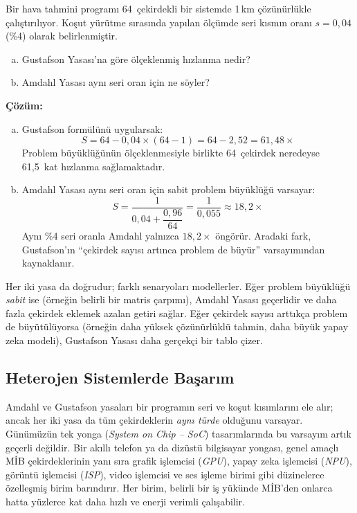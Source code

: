 \begin{ornek}[2.11]
Bir hava tahmini programı 64~çekirdekli bir sistemde 1\,km çözünürlükle çalıştırılıyor. Koşut yürütme sırasında yapılan ölçümde seri kısmın oranı $s = 0{,}04$ (\%4) olarak belirlenmiştir.
\begin{enumerate}[(a)]
    \item Gustafson Yasası'na göre ölçeklenmiş hızlanma nedir?
    \item Amdahl Yasası aynı seri oran için ne söyler?
\end{enumerate}

\textbf{Çözüm:}
\begin{enumerate}[(a)]
    \item Gustafson formülünü uygularsak:
    \[
    S = 64 - 0{,}04 \times (64 - 1) = 64 - 2{,}52 = 61{,}48\times
    \]
    Problem büyüklüğünün ölçeklenmesiyle birlikte 64~çekirdek neredeyse 61,5~kat hızlanma sağlamaktadır.

    \item Amdahl Yasası aynı seri oran için sabit problem büyüklüğü varsayar:
    \[
    S = \frac{1}{0{,}04 + \dfrac{0{,}96}{64}} = \frac{1}{0{,}055} \approx 18{,}2\times
    \]
    Aynı \%4 seri oranla Amdahl yalnızca $18{,}2\times$ öngörür. Aradaki fark, Gustafson'ın ``çekirdek sayısı artınca problem de büyür'' varsayımından kaynaklanır.
\end{enumerate}
\end{ornek}

\begin{bilginot}
Her iki yasa da doğrudur; farklı senaryoları modellerler. Eğer problem büyüklüğü \emph{sabit} ise (örneğin belirli bir matris çarpımı), Amdahl Yasası geçerlidir ve daha fazla çekirdek eklemek azalan getiri sağlar. Eğer çekirdek sayısı arttıkça problem de büyütülüyorsa (örneğin daha yüksek çözünürlüklü tahmin, daha büyük yapay zeka modeli), Gustafson Yasası daha gerçekçi bir tablo çizer.
\end{bilginot}

\subsection{Heterojen Sistemlerde Başarım}
\label{subsec:heterojen-basarim}

Amdahl ve Gustafson yasaları bir programın seri ve koşut kısımlarını ele alır; ancak her iki yasa da tüm çekirdeklerin \emph{aynı türde} olduğunu varsayar. Günümüzün tek yonga (\emph{System on Chip -- SoC}) tasarımlarında bu varsayım artık geçerli değildir. Bir akıllı telefon ya da dizüstü bilgisayar yongası, genel amaçlı MİB çekirdeklerinin yanı sıra grafik işlemcisi (\emph{GPU}), yapay zeka işlemcisi (\emph{NPU}), görüntü işlemcisi (\emph{ISP}), video işlemcisi ve ses işleme birimi gibi düzinelerce özelleşmiş birim barındırır. Her birim, belirli bir iş yükünde MİB'den onlarca hatta yüzlerce kat daha hızlı ve enerji verimli çalışabilir.


